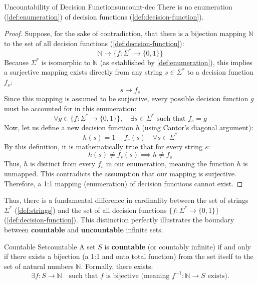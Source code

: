 \begin{theorem}{Uncountability of Decision Functions}{uncount-dec}
    There is no enumeration (\cref{def:enumeration}) of decision functions (\cref{def:decision-function}).
    \begin{proof}
        Suppose, for the sake of contradiction, that there is a bijection mapping \(\mathbb{N}\) to the set of all decision functions (\cref{def:decision-function}):
        \[
            \mathbb{N}\rightarrow\{f:\Sigma^*\rightarrow \{0,1\}\}
        \]
        Because \(\Sigma^*\) is isomorphic to \(\mathbb{N}\) (as established by \cref{def:enumeration}), this implies a surjective mapping exists directly from any string \(s \in \Sigma^*\) to a decision function \(f_s\):
        \[
            s \mapsto f_s
        \]
        Since this mapping is assumed to be surjective, every possible decision function \(g\) must be accounted for in this enumeration:
        \[
            \forall g \in \{f:\Sigma^*\rightarrow\{0,1\}\}, \quad \exists s \in \Sigma^* \text{ such that } f_s = g
        \]
        Now, let us define a new decision function \(h\) (using Cantor's diagonal argument):
        \[
            h(s) = 1 - f_s(s) \quad \forall s \in \Sigma^*
        \]
        By this definition, it is mathematically true that for every string \(s\):
        \[
            h(s) \neq f_s(s) \implies h \neq f_s
        \]
        Thus, \(h\) is distinct from every \(f_s\) in our enumeration, meaning the function \(h\) is unmapped. This contradicts the assumption that our mapping is surjective. Therefore, a 1:1 mapping (enumeration) of decision functions cannot exist.
     \end{proof}
\end{theorem}
\noindent Thus, there is a fundamental difference in cardinality between the set of strings \(\Sigma^*\) (\cref{def:strings}) and the set of all decision functions \(\{f:\Sigma^*\rightarrow \{0,1\}\}\) (\cref{def:decision-function}). This distinction perfectly illustrates the boundary between \textbf{countable} and \textbf{uncountable} infinite sets.

\begin{definition}{Countable Set}{countable}
    A set \(S\) is \textbf{countable} (or countably infinite) if and only if there exists a bijection (a 1:1 and onto total function) from the set itself to the set of natural numbers \(\mathbb{N}\). Formally, there exists:
    \[
        \exists f: S \rightarrow \mathbb{N} \quad \text{such that } f \text{ is bijective (meaning } f^{-1}: \mathbb{N} \rightarrow S \text{ exists)}.
    \]
\end{definition}

